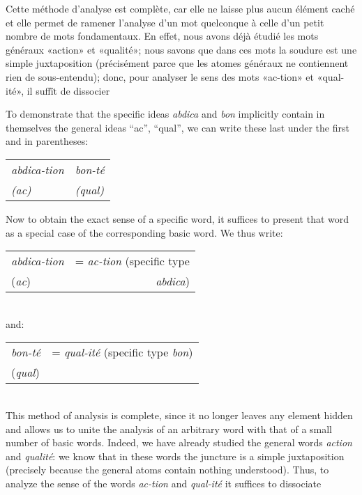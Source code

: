 \begin{sloppypar}
{  Cette méthode d’analyse est complète, car elle ne laisse plus aucun
  élément caché et elle permet de ramener l’analyse d’un mot
  quelconque à celle d’un petit nombre de mots fondamentaux. En effet,
  nous avons déjà étudié les mots généraux «action» et «qualité»; nous
  savons que dans ces mots la soudure est une simple juxtaposition
  (précisément parce que les atomes généraux ne contiennent rien de
  sous-entendu); donc, pour analyser le sens des mots «ac-tion» et
  «qual-ité», il suffît de dissocier

}
%
{To demonstrate that the specific ideas \emph{abdica} and \emph{bon}
  implicitly contain in themselves the general ideas ``ac'', ``qual'',
  we can write these last under the first and in parentheses:

  \begin{center}
    \begin{tabular}[t]{ll}
      \emph{abdica-tion}	&\emph{bon-té}\\
      \emph{(ac)}	&\emph{(qual)}
    \end{tabular}
  \end{center}

  Now to obtain the exact sense of a specific word, it suffices to
  present that word as a special case of the corresponding basic
  word. We thus write:\\[1ex]

  \noindent
  {\setlength{\tabcolsep}{2pt}
\begin{tabular}[t]{lr}
      \emph{abdica-tion}&= \emph{ac-tion} (specific type\\
      \hspace{1em}(\emph{ac}) &\emph{abdica})\\
    \end{tabular}}\\[1ex]

  \noindent
  and:\\[1ex]
 
  {\centering\setlength{\tabcolsep}{2pt}
    \begin{tabular}[t]{lr}
      \emph{bon-té}&= \emph{qual-ité} (specific type \emph{bon})\\
      (\emph{qual})
    \end{tabular}}
    \\[2ex]

  This method of analysis is complete, since it no longer leaves any
  element hidden and allows us to unite the analysis of an arbitrary
  word with that of a small number of basic words. Indeed, we have
  already studied the general words \emph{action} and \emph{qualité}: we
  know that in these words the juncture is a simple juxtaposition
  (precisely because the general atoms contain nothing understood).
  Thus, to analyze the sense of the words \emph{ac-tion} and
  \emph{qual-ité} it suffices to dissociate

}
\end{sloppypar}
